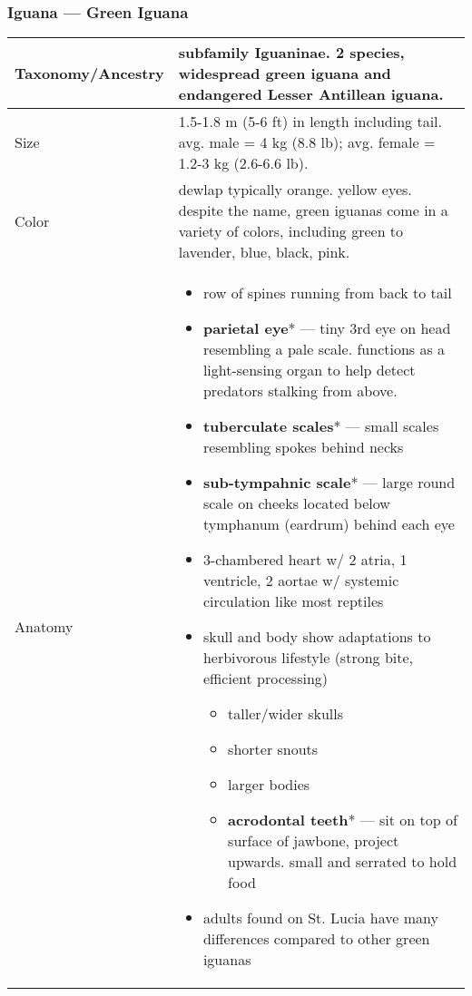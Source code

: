 \subsubsection{Iguana --- Green Iguana}
\begin{center}
\begin{longtabu} to 

	\hline
	Taxonomy/Ancestry &
	subfamily Iguaninae. 2 species, widespread green iguana and endangered Lesser Antillean iguana.
	 \\
	\hline
	Size & 
	1.5-1.8 m (5-6 ft) in length including tail. avg. male = 4 kg (8.8 lb); avg. female = 1.2-3 kg (2.6-6.6 lb). 
	\\
	\hline
	Color &
	dewlap typically orange. yellow eyes. despite the name, green iguanas come in a variety of colors, including green to lavender,  blue, black, pink.
	 \\
	\hline
	Anatomy &
	\begin{itemize}[noitemsep]
		\item row of spines running from back to tail
		\item \textbf{parietal eye}* --- tiny 3rd eye on head resembling a pale scale. functions as a light-sensing organ to help detect predators stalking from above.
		\item \textbf{tuberculate scales}* --- small scales resembling spokes behind necks
		\item \textbf{sub-tympahnic scale}* --- large round scale on cheeks located below tymphanum (eardrum) behind each eye
		\item 3-chambered heart w/ 2 atria, 1 ventricle, 2 aortae w/ systemic circulation like most reptiles 
		\item skull and body show adaptations to herbivorous lifestyle (strong bite, efficient processing)
			\begin{itemize}[noitemsep]
				\item taller/wider skulls
				\item shorter snouts
				\item larger bodies
				\item \textbf{acrodontal teeth}* --- sit on top of surface of jawbone, project upwards. small and serrated to hold food
			\end{itemize}
		\item adults found on St. Lucia have many differences compared to other green iguanas
			\begin{itemize}[noitemsep]

\end{itemize}
\end{itemize}
\end{longtabu}
\end{center}
